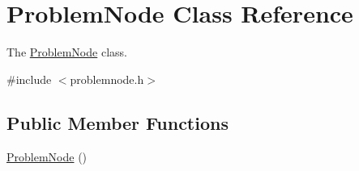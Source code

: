 \hypertarget{class_problem_node}{}\section{Problem\+Node Class Reference}
\label{class_problem_node}


The \hyperlink{class_problem_node}{Problem\+Node} class.  




{\ttfamily \#include $<$problemnode.\+h$>$}

\subsection*{Public Member Functions}
\begin{DoxyCompactItemize}
\item 
\hyperlink{class_problem_node_a9c6e0d7a1c2f47de36b468ff18aabc87}{Problem\+Node} ()\hypertarget{class_problem_node_a9c6e0d7a1c2f47de36b468ff18aabc87}{}\label{class_problem_node_a9c6e0d7a1c2f47de36b468ff18aabc87}


\end{DoxyCompactItemize}
